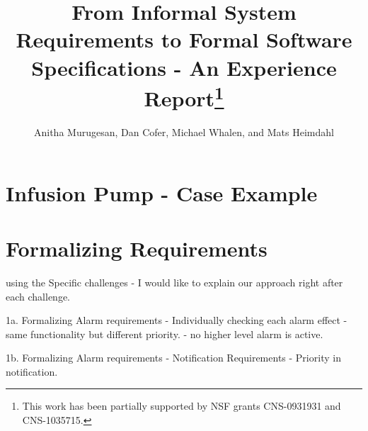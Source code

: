 \documentclass{llncs}
\begin{document}
\newcommand{\mcdc}{}%
\newcommand{\mike}[1]{\textcolor{red}{Mike: #1}}
\newcommand{\anitha}[1]{\textcolor{red}{#1}}
\newcommand{\oksana}[1]{\textcolor{magenta}{Oksana: #1}}
\newcommand{\sjp}[1]{\textcolor{blue}{#1}}
\newcommand{\nsr}[1]{\textcolor{blue}{#1}}
\sloppypar


\title{From Informal System Requirements to Formal Software Specifications  - An Experience Report\thanks{This work has been partially supported by NSF grants CNS-0931931 and CNS-1035715.}}

\author{Anitha Murugesan, Dan Cofer, Michael Whalen, and Mats Heimdahl}

\maketitle

\begin{abstract}

\end{abstract}











\iffalse
\section{Infusion Pump - Case Example}
\section{Formalizing Requirements}

using the Specific challenges - I would like to explain our approach right after each challenge.

1a. Formalizing Alarm requirements - Individually checking each alarm effect - same functionality but different priority. - no higher level alarm is active.

\vspace{2mm}

1b. Formalizing Alarm requirements - Notification Requirements - Priority in notification.

\vspace{2mm}
\end{document}
